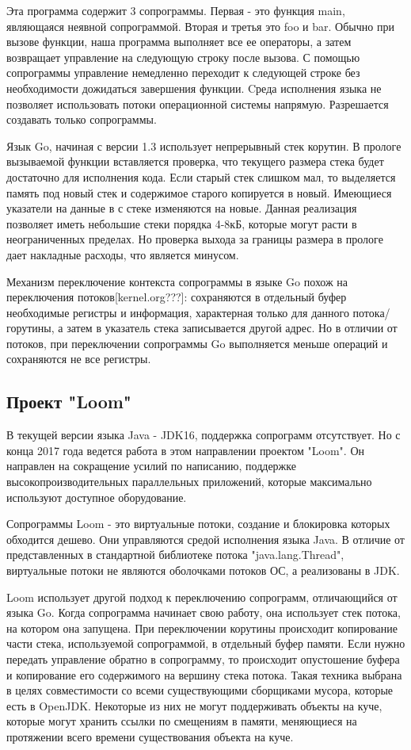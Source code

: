	Эта программа содержит 3 сопрограммы. Первая - это функция main, являющаяся
	неявной сопрограммой. Вторая и третья это foo и bar. Обычно при вызове функции, наша программа 
	выполняет все ее операторы, а затем возвращает управление на следующую строку после вызова. 
	С помощью сопрограммы управление немедленно переходит к следующей строке без необходимости дожидаться завершения функции. Cреда исполнения языка не позволяет использовать потоки операционной системы
	напрямую. Разрешается создавать только сопрограммы.
	\par
	Язык Go, начиная с версии 1.3 использует непрерывный стек корутин. В прологе вызываемой функции вставляется проверка,
	что текущего размера стека будет достаточно для исполнения кода. Если старый стек слишком мал,
	то выделяется память под новый стек и содержимое старого копируется в новый. Имеющиеся указатели на
	данные в с стеке изменяются на новые. Данная реализация позволяет иметь небольшие стеки порядка 4-8кБ, которые
	могут расти в неограниченных пределах. Но проверка выхода за границы размера в прологе дает накладные расходы,
	что является минусом.
	\par 
	Механизм переключение контекста сопрограммы в языке Go похож на переключения потоков[kernel.org???]:
	сохраняются в отдельный буфер необходимые регистры и информация, характерная только для данного
	потока/горутины, а затем в указатель стека записывается другой адрес. Но в отличии от потоков, 
	при переключении сопрограммы Go выполняется меньше операций и сохраняются не все регистры\cite{go-context}.
	
	\subsection{Проект "Loom"}
	В текущей версии языка Java - JDK16, поддержка сопрограмм отсутствует. Но с конца 2017 года ведется 
	работа в этом направлении проектом "Loom". Он направлен на сокращение усилий по написанию, поддержке
	высокопроизводительных параллельных приложений, которые максимально используют доступное оборудование\cite{loom-main}.
	\par
	Сопрограммы Loom - это виртуальные потоки, создание и блокировка которых обходится
	дешево\cite{loom-main}. Они управляются средой исполнения языка Java. В отличие от представленных в стандартной
	библиотеке потока "java.lang.Thread", виртуальные потоки не являются оболочками потоков ОС, а
	реализованы в JDK.
	
	\par
	Loom использует другой подход к переключению сопрограмм, отличающийся от языка Go. Когда сопрограмма начинает
	свою работу, она использует стек потока, на котором она запущена. При переключении корутины происходит
	копирование части стека, используемой сопрограммой, в отдельный буфер памяти. Если нужно передать 
	управление обратно в сопрограмму, то происходит опустошение буфера и копирование его содержимого на 
	вершину стека потока\cite{loom-main}. Такая техника выбрана в целях совместимости со всеми существующими 
	сборщиками мусора, которые есть в OpenJDK. Некоторые из них не могут поддерживать объекты на куче, которые
	могут хранить ссылки по смещениям в памяти, меняющиеся на протяжении всего времени существования объекта
	на куче.

